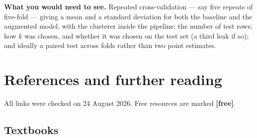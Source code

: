 \documentclass[11pt]{article}
\begin{document}
\textbf{What you would need to see.} Repeated cross-validation --- say five
repeats of five-fold --- giving a mean and a standard deviation for both the
baseline and the augmented model, with the clusterer inside the pipeline; the
number of test rows; how $k$ was chosen, and whether it was chosen on the test
set (a third leak if so); and ideally a paired test across folds rather than
two point estimates.

\section{References and further reading}
\label{sec:refs}

All links were checked on 24 August 2026. Free resources are marked
\textbf{[free]}.

\subsection*{Textbooks}
\end{document}
